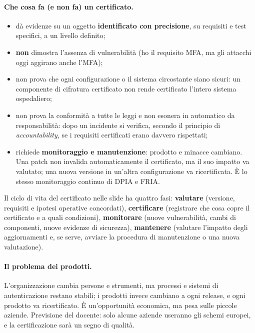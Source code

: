 \paragraph{Che cosa fa (e non fa) un certificato.}
\begin{itemize}
  \item dà evidenze su un oggetto \textbf{identificato con precisione}, su requisiti e test specifici, a
    un livello definito;
  \item \textbf{non} dimostra l'assenza di vulnerabilità (ho il requisito MFA, ma gli attacchi oggi
    aggirano anche l'MFA);
  \item non prova che ogni configurazione o il sistema circostante siano sicuri: un componente di
    cifratura certificato non rende certificato l'intero sistema ospedaliero;
  \item non prova la conformità a tutte le leggi e non esonera in automatico da responsabilità: dopo un
    incidente si verifica, secondo il principio di \emph{accountability}, se i requisiti certificati erano
    davvero rispettati;
  \item richiede \textbf{monitoraggio e manutenzione}: prodotto e minacce cambiano. Una patch non
    invalida automaticamente il certificato, ma il suo impatto va valutato; una nuova versione in
    un'altra configurazione va ricertificata. È lo stesso monitoraggio continuo di DPIA e FRIA.
\end{itemize}
Il ciclo di vita del certificato nelle slide ha quattro fasi: \textbf{valutare} (versione, requisiti e
ipotesi operative concordati), \textbf{certificare} (registrare che cosa copre il certificato e a quali
condizioni), \textbf{monitorare} (nuove vulnerabilità, cambi di componenti, nuove evidenze di sicurezza),
\textbf{mantenere} (valutare l'impatto degli aggiornamenti e, se serve, avviare la procedura di
manutenzione o una nuova valutazione).

\paragraph{Il problema dei prodotti.} L'organizzazione cambia persone e strumenti, ma processi e sistemi
di autenticazione restano stabili; i prodotti invece cambiano a ogni release, e ogni prodotto va
ricertificato. È un'opportunità economica, ma pesa sulle piccole aziende. Previsione del docente: solo
alcune aziende useranno gli schemi europei, e la certificazione sarà un segno di qualità.

